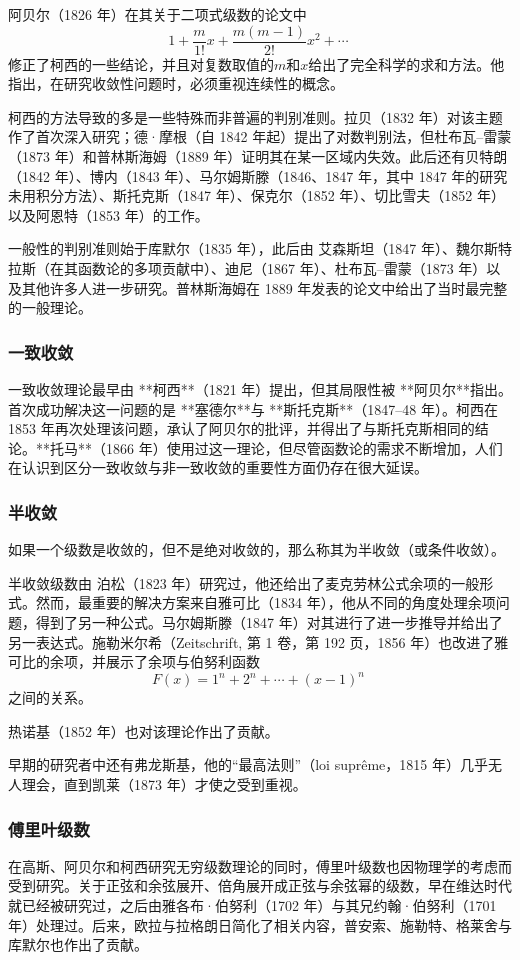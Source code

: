 阿贝尔（1826 年）在其关于二项式级数的论文中
$$
1 + \frac{m}{1!}x + \frac{m(m-1)}{2!}x^{2} + \cdots~
$$
修正了柯西的一些结论，并且对复数取值的$m$和$x$给出了完全科学的求和方法。他指出，在研究收敛性问题时，必须重视连续性的概念。

柯西的方法导致的多是一些特殊而非普遍的判别准则。拉贝（1832 年）对该主题作了首次深入研究；德·摩根（自 1842 年起）提出了对数判别法，但杜布瓦–雷蒙（1873 年）和普林斯海姆（1889 年）证明其在某一区域内失效。此后还有贝特朗（1842 年）、博内（1843 年）、马尔姆斯滕（1846、1847 年，其中 1847 年的研究未用积分方法）、斯托克斯（1847 年）、保克尔（1852 年）、切比雪夫（1852 年）以及阿恩特（1853 年）的工作。

一般性的判别准则始于库默尔（1835 年），此后由 艾森斯坦（1847 年）、魏尔斯特拉斯（在其函数论的多项贡献中）、迪尼（1867 年）、杜布瓦–雷蒙（1873 年）以及其他许多人进一步研究。普林斯海姆在 1889 年发表的论文中给出了当时最完整的一般理论。
\subsubsection{一致收敛}
一致收敛理论最早由 **柯西**（1821 年）提出，但其局限性被 **阿贝尔**指出。首次成功解决这一问题的是 **塞德尔**与 **斯托克斯**（1847–48 年）。柯西在 1853 年再次处理该问题，承认了阿贝尔的批评，并得出了与斯托克斯相同的结论。**托马**（1866 年）使用过这一理论，但尽管函数论的需求不断增加，人们在认识到区分一致收敛与非一致收敛的重要性方面仍存在很大延误。
\subsubsection{半收敛}
如果一个级数是收敛的，但不是绝对收敛的，那么称其为半收敛（或条件收敛）。

半收敛级数由 泊松（1823 年）研究过，他还给出了麦克劳林公式余项的一般形式。然而，最重要的解决方案来自雅可比（1834 年），他从不同的角度处理余项问题，得到了另一种公式。马尔姆斯滕（1847 年）对其进行了进一步推导并给出了另一表达式。施勒米尔希（Zeitschrift, 第 1 卷，第 192 页，1856 年）也改进了雅可比的余项，并展示了余项与伯努利函数
$$
F(x) = 1^{n} + 2^{n} + \cdots + (x-1)^{n}~
$$
之间的关系。

热诺基（1852 年）也对该理论作出了贡献。

早期的研究者中还有弗龙斯基，他的“最高法则”（loi suprême，1815 年）几乎无人理会，直到凯莱（1873 年）才使之受到重视。
\subsubsection{傅里叶级数}
在高斯、阿贝尔和柯西研究无穷级数理论的同时，傅里叶级数也因物理学的考虑而受到研究。关于正弦和余弦展开、倍角展开成正弦与余弦幂的级数，早在维达时代就已经被研究过，之后由雅各布·伯努利（1702 年）与其兄约翰·伯努利（1701 年）处理过。后来，欧拉与拉格朗日简化了相关内容，普安索、施勒特、格莱舍与库默尔也作出了贡献。

